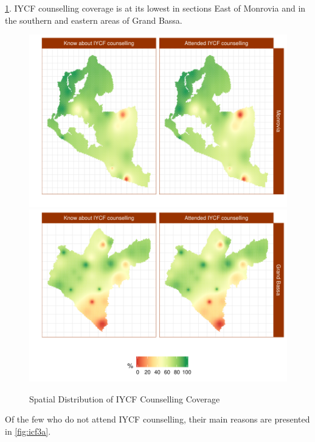 \documentclass[12pt,a4paper]{article}
\begin{document}
 \ref{fig:icfMap}. IYCF counselling coverage is at its lowest in sections East of Monrovia and in the southern and eastern areas of Grand Bassa.

\begin{figure}[H]

{\centering \includegraphics{liberiaCoverageReport_files/figure-latex/icfMap-1} \includegraphics{liberiaCoverageReport_files/figure-latex/icfMap-2} 

}

\caption{Spatial Distribution of IYCF Counselling Coverage}\label{fig:icfMap}
\end{figure}

Of the few who do not attend IYCF counselling, their main reasons are presented in \ref{fig:icf3a}.
\end{document}
